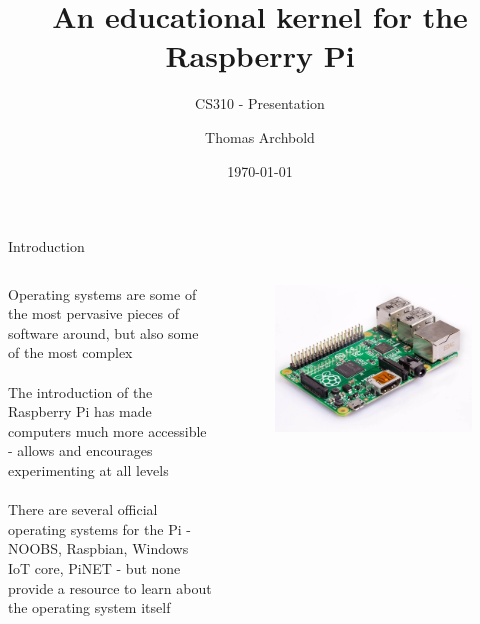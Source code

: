 \documentclass[10pt]{beamer}
\title{An educational kernel for the Raspberry Pi}
\subtitle{CS310 - Presentation}
\author{Thomas Archbold}
\date{\today}
\begin{document}
\begin{frame}
    \titlepage
\end{frame}

\begin{frame}{Introduction}

\begin{columns}[c]
    Operating systems are some of the most pervasive pieces of software around,
    but also some of the most complex \\~\\

    The introduction of the Raspberry Pi has made computers much more accessible
    - allows and encourages experimenting at all levels \\~\\

    There are several official operating systems for the Pi - NOOBS, Raspbian,
    Windows IoT core, PiNET - but none provide a resource to learn about the
    operating system itself

    \begin{figure}
        \includegraphics[width=\linewidth]{raspi1B.jpg}
    \end{figure}
\end{columns}

\end{frame}
\end{document}
